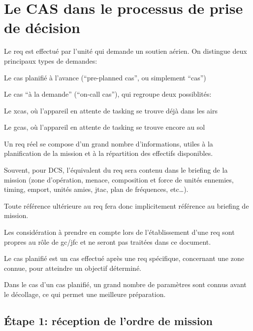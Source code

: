 \section{Le CAS dans le processus de prise de décision}


\begin{e1}
	\item Le \gls{req} est effectué par l'unité qui demande un soutien aérien. On distingue deux principaux types de demandes:
	\begin{e2}
		\item Le \gls{cas} planifié à l'avance (``pre-planned \gls{cas}'', ou simplement ``\gls{cas}'')
		\item Le \gls{cas} ``à la demande'' (``on-call cas''), qui regroupe deux possiblités:
		\begin{e3}
			\item Le \gls{xcas}, où l'appareil en attente de tasking se trouve déjà dans les airs
			\item Le \gls{gcas}, où l'appareil en attente de tasking se trouve encore au sol
		\end{e3}
	\end{e2}
	\item Un \gls{req} réel se compose d'un grand nombre d'informations, utiles à la planification de la mission et à la répartition des effectifs disponibles.
	\item
	Souvent, pour DCS, l'équivalent du \gls{req} sera contenu dans le briefing de la mission (zone d'opération, menace, composition et force de unités ennemies, timing, emport, unités amies, \gls{jtac}, plan de fréquences, etc…).
	\item Toute référence ultérieure au \gls{req} fera donc implicitement référence au briefing de mission.
	\item Les considération à prendre en compte lors de l'établissement d'une \gls{req} sont propres au rôle de \gls{gc}/\gls{jfc} et ne seront pas traitées dans ce document.
	\item Le \gls{cas} planifié est un \gls{cas} effectué après une \gls{req} spécifique, concernant une zone connue, pour atteindre un objectif déterminé.
	\item Dans le cas d'un \gls{cas} planifié, un grand nombre de paramètres sont connus avant le décollage, ce qui permet une meilleure préparation.
\end{e1}

\subsection{Étape 1: réception de l'ordre de mission}

